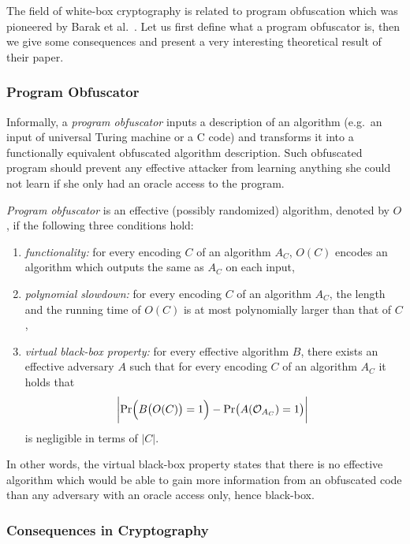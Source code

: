 The field of white-box cryptography is related to program obfuscation which was pioneered by Barak et al.\ \cite{barak2001possibility}. Let us first define what a program obfuscator is, then we give some consequences and present a very interesting theoretical result of their paper.

\subsubsection{Program Obfuscator}
	
	Informally, a {\em program obfuscator} inputs a description of an algorithm (e.g.\ an input of universal Turing machine or a C code) and transforms it into a functionally equivalent obfuscated algorithm description. Such obfuscated program should prevent any effective attacker from learning anything she could not learn if she only had an oracle access to the program.
	
	\begin{defn}
	\label{def:obfus}
		{\em Program obfuscator} is an effective (possibly randomized) algorithm, denoted by $O$, if the following three conditions hold:
		\begin{enumerate}
			\item {\em functionality:} for every encoding $C$ of an algorithm $A_C$, $O(C)$ encodes an algorithm which outputs the same as $A_C$ on each input,
			\item {\em polynomial slowdown:} for every encoding $C$ of an algorithm $A_C$, the length and the running time of $O(C)$ is at most polynomially larger than that of $C$,
			\item {\em virtual black-box property:} for every effective algorithm $B$, there exists an effective adversary $A$ such that for every encoding $C$ of an algorithm $A_C$ it holds that
			\[
				\biggl| \Pr\Bigl(B\bigl(O(C)\bigr)=1\Bigr) - \Pr\bigl(A({\cal O}_{A_C})=1\bigr) \biggr| \
			\]
			is negligible in terms of $|C|$.
		\end{enumerate}
	\end{defn}
	
	In other words, the virtual black-box property states that there is no effective algorithm which would be able to gain more information from an obfuscated code than any adversary with an oracle access only, hence black-box.

\subsubsection{Consequences in Cryptography}
	
